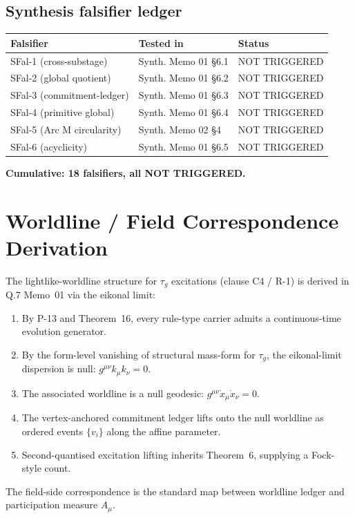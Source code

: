 \documentclass[11pt,a4paper]{article}
\begin{document}
\subsection{Synthesis falsifier ledger}

\begin{center}
\begin{tabular}{lll}
\toprule
\textbf{Falsifier} & \textbf{Tested in} & \textbf{Status} \\
\midrule
SFal-1 (cross-substage) & Synth. Memo 01 \S6.1 & NOT TRIGGERED \\
SFal-2 (global quotient) & Synth. Memo 01 \S6.2 & NOT TRIGGERED \\
SFal-3 (commitment-ledger) & Synth. Memo 01 \S6.3 & NOT TRIGGERED \\
SFal-4 (primitive global) & Synth. Memo 01 \S6.4 & NOT TRIGGERED \\
SFal-5 (Arc M circularity) & Synth. Memo 02 \S4 & NOT TRIGGERED \\
SFal-6 (acyclicity) & Synth. Memo 01 \S6.5 & NOT TRIGGERED \\
\bottomrule
\end{tabular}
\end{center}

\noindent \textbf{Cumulative: 18 falsifiers, all NOT TRIGGERED.}

\section{Worldline / Field Correspondence Derivation}

The lightlike-worldline structure for $\tau_g$ excitations (clause C4 / R-1) is derived in Q.7 Memo~01 via the eikonal limit:
\begin{enumerate}[leftmargin=2em]
  \item By P-13 and Theorem~16, every rule-type carrier admits a continuous-time evolution generator.
  \item By the form-level vanishing of structural mass-form for $\tau_g$, the eikonal-limit dispersion is null: $g^{\mu\nu} k_\mu k_\nu = 0$.
  \item The associated worldline is a null geodesic: $g^{\mu\nu} \dot{x}_\mu \dot{x}_\nu = 0$.
  \item The vertex-anchored commitment ledger lifts onto the null worldline as ordered events $\{v_i\}$ along the affine parameter.
  \item Second-quantised excitation lifting inherits Theorem~6, supplying a Fock-style count.
\end{enumerate}
The field-side correspondence is the standard map between worldline ledger and participation measure $A_\mu$.
\end{document}
